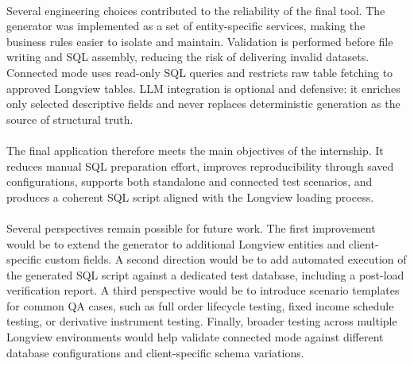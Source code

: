 \paragraph{}Several engineering choices contributed to the reliability of the final tool. The generator was
implemented as a set of entity-specific services, making the business rules easier to isolate and
maintain. Validation is performed before file writing and SQL assembly, reducing the risk of
delivering invalid datasets. Connected mode uses read-only SQL queries and restricts raw table
fetching to approved Longview tables. LLM integration is optional and defensive: it enriches only
selected descriptive fields and never replaces deterministic generation as the source of structural
truth.

\paragraph{}The final application therefore meets the main objectives of the internship. It reduces manual
SQL preparation effort, improves reproducibility through saved configurations, supports both
standalone and connected test scenarios, and produces a coherent SQL script aligned with the
Longview loading process.

\paragraph{}Several perspectives remain possible for future work. The first improvement would be to extend
the generator to additional Longview entities and client-specific custom fields. A second direction
would be to add automated execution of the generated SQL script against a dedicated test database,
including a post-load verification report. A third perspective would be to introduce scenario
templates for common QA cases, such as full order lifecycle testing, fixed income schedule testing,
or derivative instrument testing. Finally, broader testing across multiple Longview environments
would help validate connected mode against different database configurations and client-specific
schema variations.
